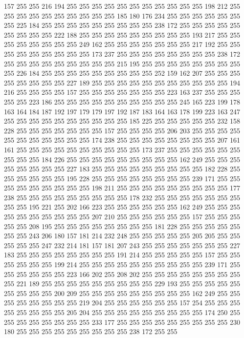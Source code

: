 157 255 255 216 194 255 255 255 255 255 255 255 255 255 255 255 198 212 255 255
255 255 255 255 255 255 255 255 185 180 176 234 255 255 255 255 255 255 255 225
184 255 255 255 255 255 255 255 255 255 238 172 255 255 255 255 255 255 255 255
255 222 188 255 255 255 255 255 255 255 255 255 193 217 255 255 255 255 255 255
255 255 249 162 255 255 255 255 255 255 255 217 192 255 255 255 255 255 255 255
255 255 173 237 255 255 255 255 255 255 255 255 238 172 255 255 255 255 255 255
255 255 255 215 195 255 255 255 255 255 255 255 255 255 226 184 255 255 255 255
255 255 255 255 255 252 159 162 207 255 255 255 255 255 255 255 255 227 189 255
255 255 255 255 255 255 255 255 255 255 194 216 255 255 255 255 157 255 255 255
255 255 255 255 223 163 237 255 255 255 255 255 223 186 255 255 255 255 255 255
255 255 255 255 245 165 223 199 178 163 164 184 187 192 197 179 179 197 192 187
183 164 163 178 199 223 163 247 255 255 255 255 255 255 255 255 255 255 185 225
255 255 255 255 255 232 158 228 255 255 255 255 255 255 255 157 255 255 255 255
206 203 255 255 255 255 255 255 255 255 255 255 255 174 238 255 255 255 255 255
255 255 255 207 161 161 255 255 255 255 255 255 255 255 255 255 173 237 255 255
255 255 255 255 255 255 255 184 226 255 255 255 255 255 255 255 255 255 162 249
255 255 255 255 255 255 255 255 227 183 255 255 255 255 255 255 255 255 255 182
228 255 255 255 255 255 255 195 228 255 255 255 255 255 255 255 255 239 171 255
255 255 255 255 255 255 255 255 198 211 255 255 255 255 255 255 255 255 255 177
238 255 255 255 255 255 255 255 255 255 178 232 255 255 255 255 255 255 255 255
255 195 221 255 202 166 223 255 255 255 255 255 255 162 249 255 255 255 255 255
255 255 255 255 255 207 210 255 255 255 255 255 255 157 255 255 255 255 255 208
195 255 255 255 255 255 255 255 255 181 228 255 255 255 255 255 255 255 243 206
180 157 181 214 232 248 255 255 255 255 255 205 205 255 255 255 255 255 247 232
214 181 157 181 207 243 255 255 255 255 255 255 255 227 183 255 255 255 255 255
255 255 255 191 214 255 255 255 255 255 157 255 255 255 255 255 255 199 214 255
255 255 255 255 255 255 255 255 255 239 171 255 255 255 255 255 255 223 166 202
255 208 202 255 255 255 255 255 255 255 255 255 221 189 255 255 255 255 255 255
255 255 255 229 193 255 255 255 255 255 255 255 255 255 200 209 255 255 255 255
255 255 255 255 255 162 249 255 255 255 255 255 255 255 255 219 204 255 255 255
255 255 255 157 254 255 255 255 255 255 255 255 255 205 204 255 255 255 255 255
255 255 255 255 174 250 255 255 255 255 255 255 255 255 233 177 255 255 255 255
255 255 255 255 255 230 180 255 255 255 255 255 255 255 255 255 238 172 255 255
